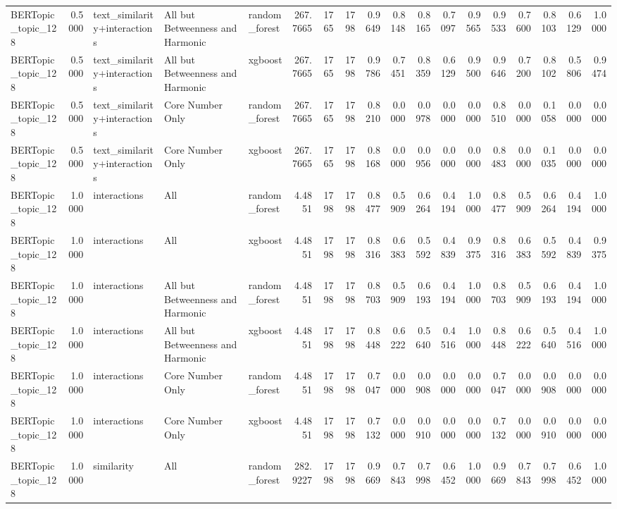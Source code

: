 \begin{tabular}{lrlllrrrrrrrrrrrrr}
BERTopic_topic_128 & 0.5000 & text_similarity+interactions & All but Betweenness and Harmonic & random_forest & 267.7665 & 1765 & 1798 & 0.9649 & 0.8148 & 0.8165 & 0.7097 & 0.9565 & 0.9533 & 0.7600 & 0.8103 & 0.6129 & 1.0000 \\
BERTopic_topic_128 & 0.5000 & text_similarity+interactions & All but Betweenness and Harmonic & xgboost & 267.7665 & 1765 & 1798 & 0.9786 & 0.7451 & 0.8359 & 0.6129 & 0.9500 & 0.9646 & 0.7200 & 0.8102 & 0.5806 & 0.9474 \\
BERTopic_topic_128 & 0.5000 & text_similarity+interactions & Core Number Only & random_forest & 267.7665 & 1765 & 1798 & 0.8210 & 0.0000 & 0.0978 & 0.0000 & 0.0000 & 0.8510 & 0.0000 & 0.1058 & 0.0000 & 0.0000 \\
BERTopic_topic_128 & 0.5000 & text_similarity+interactions & Core Number Only & xgboost & 267.7665 & 1765 & 1798 & 0.8168 & 0.0000 & 0.0956 & 0.0000 & 0.0000 & 0.8483 & 0.0000 & 0.1035 & 0.0000 & 0.0000 \\
BERTopic_topic_128 & 1.0000 & interactions & All & random_forest & 4.4851 & 1798 & 1798 & 0.8477 & 0.5909 & 0.6264 & 0.4194 & 1.0000 & 0.8477 & 0.5909 & 0.6264 & 0.4194 & 1.0000 \\
BERTopic_topic_128 & 1.0000 & interactions & All & xgboost & 4.4851 & 1798 & 1798 & 0.8316 & 0.6383 & 0.5592 & 0.4839 & 0.9375 & 0.8316 & 0.6383 & 0.5592 & 0.4839 & 0.9375 \\
BERTopic_topic_128 & 1.0000 & interactions & All but Betweenness and Harmonic & random_forest & 4.4851 & 1798 & 1798 & 0.8703 & 0.5909 & 0.6193 & 0.4194 & 1.0000 & 0.8703 & 0.5909 & 0.6193 & 0.4194 & 1.0000 \\
BERTopic_topic_128 & 1.0000 & interactions & All but Betweenness and Harmonic & xgboost & 4.4851 & 1798 & 1798 & 0.8448 & 0.6222 & 0.5640 & 0.4516 & 1.0000 & 0.8448 & 0.6222 & 0.5640 & 0.4516 & 1.0000 \\
BERTopic_topic_128 & 1.0000 & interactions & Core Number Only & random_forest & 4.4851 & 1798 & 1798 & 0.7047 & 0.0000 & 0.0908 & 0.0000 & 0.0000 & 0.7047 & 0.0000 & 0.0908 & 0.0000 & 0.0000 \\
BERTopic_topic_128 & 1.0000 & interactions & Core Number Only & xgboost & 4.4851 & 1798 & 1798 & 0.7132 & 0.0000 & 0.0910 & 0.0000 & 0.0000 & 0.7132 & 0.0000 & 0.0910 & 0.0000 & 0.0000 \\
BERTopic_topic_128 & 1.0000 & similarity & All & random_forest & 282.9227 & 1798 & 1798 & 0.9669 & 0.7843 & 0.7998 & 0.6452 & 1.0000 & 0.9669 & 0.7843 & 0.7998 & 0.6452 & 1.0000 \\

\end{tabular}
